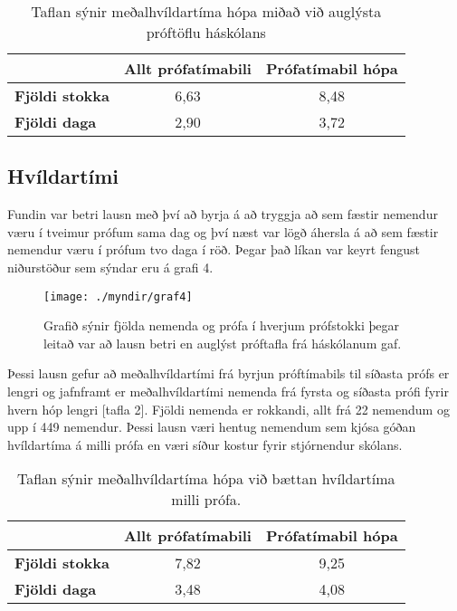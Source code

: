 \documentclass[12pt]{article}
\begin{document}
\begin{table}[h]
    \centering
    \begin{tabular}{l|c|c|}
        \cline{2-3}
        & \multicolumn{1}{l|}{\textbf{Allt prófatímabili}} & \multicolumn{1}{l|}{\textbf{Prófatímabil hópa}} \\ \hline
        \multicolumn{1}{|l|}{\textbf{Fjöldi stokka}} & 6,63                                             & 8,48                                            \\ \hline
        \multicolumn{1}{|l|}{\textbf{Fjöldi daga}}   & 2,90                                             & 3,72                                            \\ \hline
    \end{tabular}
    \caption{Taflan sýnir meðalhvíldartíma hópa miðað við auglýsta próftöflu háskólans}
\end{table}

\newpage

\subsection{Hvíldartími}

Fundin var betri lausn með því að byrja á að tryggja að sem fæstir nemendur væru í tveimur prófum sama dag og því næst var lögð áhersla á að sem fæstir nemendur væru í prófum tvo daga í röð. Þegar það líkan var keyrt fengust niðurstöður sem sýndar eru á grafi 4.


\begin{figure}[h]
    \centering
    \texttt{[image: ./myndir/graf4]}
    \caption{Grafið sýnir fjölda nemenda og prófa í hverjum prófstokki þegar leitað var að lausn betri en auglýst próftafla frá háskólanum gaf.}
\end{figure}

\newpage

Þessi lausn gefur að meðalhvíldartími frá byrjun próftímabils til síðasta prófs er lengri og jafnframt er meðalhvíldartími nemenda frá fyrsta og síðasta prófi fyrir hvern hóp lengri [tafla 2]. 
Fjöldi nemenda er rokkandi, allt frá 22 nemendum og upp í 449 nemendur. Þessi lausn væri hentug nemendum sem kjósa góðan hvíldartíma á milli prófa en væri síður kostur fyrir stjórnendur skólans.


\begin{table}[h]
    \centering
    \begin{tabular}{l|c|c|}
        \cline{2-3}
        & \multicolumn{1}{l|}{\textbf{Allt prófatímabili}} & \multicolumn{1}{l|}{\textbf{Prófatímabil hópa}} \\ \hline
        \multicolumn{1}{|l|}{\textbf{Fjöldi stokka}} & 7,82                                             & 9,25                                            \\ \hline
        \multicolumn{1}{|l|}{\textbf{Fjöldi daga}}   & 3,48                                             & 4,08                                            \\ \hline
    \end{tabular}
    \caption{Taflan sýnir meðalhvíldartíma hópa við bættan hvíldartíma milli prófa.}
\end{table}
\end{document}

